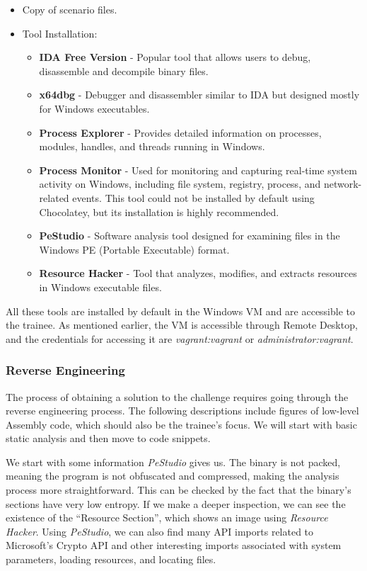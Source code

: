 \begin{itemize}
    \item Copy of scenario files.
    \item Tool Installation:
    \begin{itemize}
        \item \textbf{IDA Free Version} - Popular tool that allows users to debug, disassemble and decompile binary files.
        \item \textbf{x64dbg} - Debugger and disassembler similar to IDA but designed mostly for Windows executables.
        \item \textbf{Process Explorer} - Provides detailed information on processes, modules, handles, and threads running in Windows.
        \item \textbf{Process Monitor} - Used for monitoring and capturing real-time system activity on Windows, including file system, registry, process, and network-related events. This tool could not be installed by default using Chocolatey, but its installation is highly recommended.
        \item \textbf{PeStudio} - Software analysis tool designed for examining files in the Windows PE (Portable Executable) format.
        \item \textbf{Resource Hacker} - Tool that analyzes, modifies, and extracts resources in Windows executable files.
    \end{itemize}
\end{itemize}

All these tools are installed by default in the Windows VM and are accessible to the trainee. As mentioned earlier, the VM is accessible through Remote Desktop, and the credentials for accessing it are \textit{vagrant:vagrant} or \textit{administrator:vagrant}.

\subsubsection{Reverse Engineering} \label{sec:validation_ransomware_solution}

The process of obtaining a solution to the challenge requires going through the reverse engineering process. The following descriptions include figures of low-level Assembly code, which should also be the trainee's focus. We will start with basic static analysis and then move to code snippets.

We start with some information \textit{PeStudio} gives us. The binary is not packed, meaning the program is not obfuscated and compressed, making the analysis process more straightforward. This can be checked by the fact that the binary's sections have very low entropy. If we make a deeper inspection, we can see the existence of the ``Resource Section'', which shows an image using \textit{Resource Hacker}. Using \textit{PeStudio}, we can also find many API imports related to Microsoft's Crypto API and other interesting imports associated with system parameters, loading resources, and locating files.

